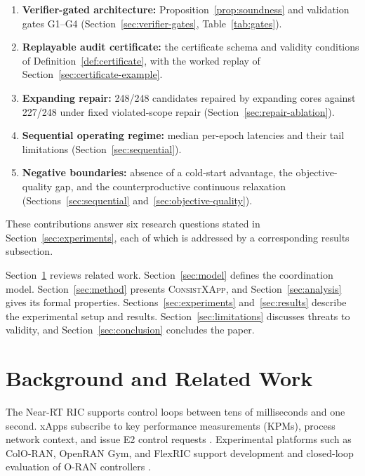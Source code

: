 \documentclass[pdflatex,sn-mathphys-num,iicol,oneside]{sn-jnl}
\newcommand{\method}{\textsc{ConsistXApp}\xspace}
\begin{document}
\begin{enumerate}[label=(C\arabic*),leftmargin=2.4em]
\item \textbf{Verifier-gated architecture:}
Proposition~\ref{prop:soundness} and validation gates G1--G4
(Section~\ref{sec:verifier-gates}, Table~\ref{tab:gates}).
\item \textbf{Replayable audit certificate:} the certificate schema
and validity conditions of Definition~\ref{def:certificate}, with the
worked replay of Section~\ref{sec:certificate-example}.
\item \textbf{Expanding repair:} 248/248 candidates repaired by
expanding cores against 227/248 under fixed violated-scope repair
(Section~\ref{sec:repair-ablation}).
\item \textbf{Sequential operating regime:} median per-epoch
latencies and their tail limitations
(Section~\ref{sec:sequential}).
\item \textbf{Negative boundaries:} absence of a cold-start
advantage, the objective-quality gap, and the counterproductive
continuous relaxation (Sections~\ref{sec:sequential}
and~\ref{sec:objective-quality}).
\end{enumerate}

These contributions answer six research questions stated in
Section~\ref{sec:experiments}, each of which is addressed by a
corresponding results subsection.

Section~\ref{sec:background} reviews related work.
Section~\ref{sec:model} defines the coordination model.
Section~\ref{sec:method} presents \method, and
Section~\ref{sec:analysis} gives its formal properties.
Sections~\ref{sec:experiments} and~\ref{sec:results} describe the
experimental setup and results.
Section~\ref{sec:limitations} discusses threats to validity, and
Section~\ref{sec:conclusion} concludes the paper.

\section{Background and Related Work}
\label{sec:background}

The Near-RT RIC supports control loops between tens of milliseconds
and one second. xApps subscribe to key performance measurements
(KPMs), process network context, and issue E2 control requests
\cite{polese2023oran}. Experimental platforms such as ColO-RAN,
OpenRAN Gym, and FlexRIC support development and closed-loop
evaluation of O-RAN controllers
\cite{polese2022coloran,bonati2023openrangym,schmidt2021flexric}.
\end{document}
